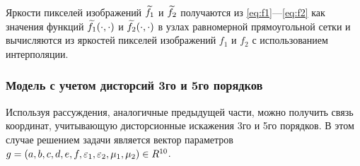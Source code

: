 Яркости пикселей изображений $\widetilde{f_1}$ и $\widetilde{f_2}$ получаются из \eqref{eq:f1}---\eqref{eq:f2} как значения функций $\widetilde{f_1}(\cdot, \cdot)$ и $\widetilde{f_2}(\cdot, \cdot)$  в узлах равномерной прямоугольной
сетки и вычисляются из яркостей пикселей изображений $f_1$ и $f_2$ с использованием интерполяции.


\subsubsection{Модель с учетом дисторсий 3го и 5го порядков}
Используя рассуждения, аналогичные предыдущей части, можно получить связь координат, учитывающую дисторсионные искажения 3го и 5го порядков. В этом случае решением задачи является вектор параметров $g = (a, b, c, d, e, f, \varepsilon_1, \varepsilon_2, \mu_1, \mu_2) \in R^{10}$.

